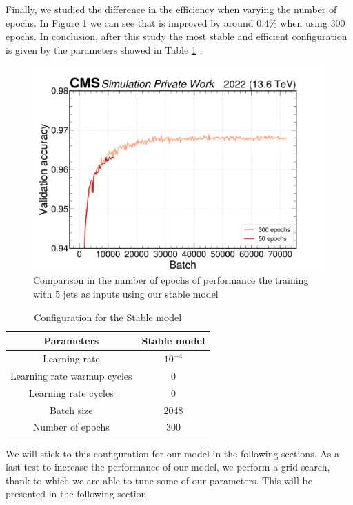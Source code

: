 Finally, we studied the difference in the efficiency when varying the number of epochs. In Figure \ref{fig: epoch diff} we can see that is improved by around 0.4\% when using 300 epochs. In conclusion, after this study the most stable and efficient configuration is given by the parameters showed in Table \ref{table: stable model} .

\begin{figure}[hbt]
    \centering
    \includegraphics[width=0.7\linewidth]{Images/6.Improving/Variability Study/epoch comp.png}
    \caption{Comparison in the number of epochs of performance the training with 5 jets as inputs using our stable model}
    \label{fig: epoch diff}
\end{figure}

\begin{table}[hbt]
\centering
\begin{tabular}{|c|c|}
 \hline
 Parameters  & Stable model  \\
 \hline
 Learning rate &  $10^{-4}$ \\
 \hline
 Learning rate warmup cycles &  0\\
 \hline
  Learning rate cycles & 0\\
 \hline
 Batch size & 2048 \\
 \hline
 Number of epochs & 300 \\
 \hline
\end{tabular}
\caption{Configuration for the Stable model}
\label{table: stable model}
\end{table}


We will stick to this configuration for our model in the following sections. As a last test to increase the performance of our model, we perform a grid search, thank to which we are able to tune some of our parameters. This will be presented in the following section.

\newpage

